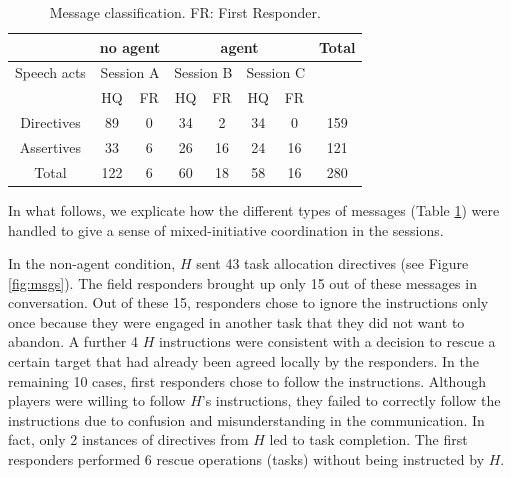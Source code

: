 \begin{table}[ht]\small\centering
\begin{tabular}{c | c c | c c c c | c}
 & \multicolumn{2}{c|}{no agent} &  \multicolumn{4}{c|}{agent} & Total \\
 \hline
 Speech acts & \multicolumn{2}{c|}{Session A} & \multicolumn{2}{c}{Session B} & \multicolumn{2}{c|}{Session C} & \\
  & HQ & FR & HQ & FR & HQ & FR & \\
  \hline
  Directives & 89 & 0 & 34 & 2 & 34 & 0 & 159 \\
  Assertives & 33 & 6 & 26 & 16 & 24 & 16 & 121 \\
  \hline
  Total & 122 & 6 & 60 & 18 & 58 & 16 & 280 \\
\end{tabular}
 \caption{Message classification. FR: First Responder.} \label{tab:msgs}
\end{table}

In what follows, we explicate how the different types of messages (Table \ref{tab:msgs}) were handled to give a sense of mixed-initiative coordination in the sessions.


In the non-agent condition, $H$ sent 43 task allocation directives (see Figure \ref{fig:msgs}). The field responders brought up only 15 out of these messages in conversation. Out of these 15, responders chose to ignore the instructions only once because they were engaged in another task that they did not want to abandon. A further 4 $H$ instructions were consistent with a decision to rescue a certain target that had already been agreed locally by the responders. In the remaining 10 cases, first responders chose to follow the instructions. Although players were willing to follow $H$'s instructions, they failed to correctly follow the instructions due to confusion and misunderstanding in the communication. In fact, only 2 instances of directives from $H$ led to task completion. The first responders performed 6 rescue operations (tasks) without being instructed by $H$.

